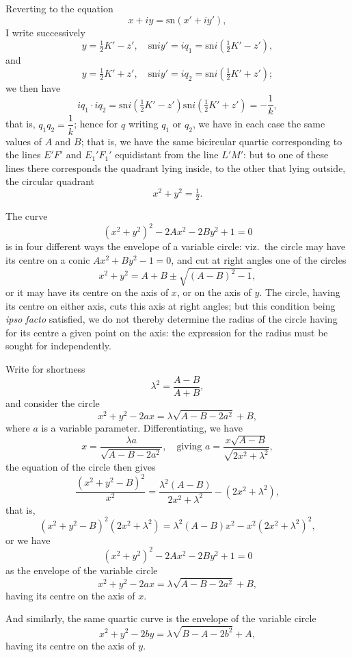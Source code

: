 \documentclass[11pt,a4paper]{book}
\providecommand{\sn}{\mathrm{sn}}
\begin{document}
Reverting to the equation
\[
x + iy = \sn(x' + iy'),
\]
I write successively
\[
y = \tfrac{1}{2}K' - z',\quad \sn iy' = iq_1 = \sn i(\tfrac{1}{2}K' - z'),
\]
and
\[
y = \tfrac{1}{2}K' + z',\quad \sn iy' = iq_2 = \sn i(\tfrac{1}{2}K' + z');
\]
we then have
\[
iq_1 \cdot iq_2 = \sn i(\tfrac{1}{2}K' - z') \sn i(\tfrac{1}{2}K' + z') = -\frac{1}{k},
\]
that is, $q_1q_2 = \dfrac{1}{k}$; hence for $q$ writing $q_1$ or $q_2$, we have in each case the same values of $A$ and $B$; that is, we have the same bicircular quartic corresponding to the lines $E'F'$ and $E_1'F_1'$ equidistant from the line $L'M'$: but to one of these lines there corresponds the quadrant lying inside, to the other that lying outside, the circular quadrant
\[
x^2 + y^2 = \tfrac{1}{2}.
\]

The curve
\[
(x^2+y^2)^2 - 2Ax^2 - 2By^2 + 1 = 0
\]
is in four different ways the envelope of a variable circle: viz.\ the circle may have its centre on a conic $Ax^2 + By^2 - 1 = 0$, and cut at right angles one of the circles
\[
x^2 + y^2 = A + B \pm \sqrt{(A-B)^2 - 1},
\]
or it may have its centre on the axis of $x$, or on the axis of $y$. The circle, having its centre on either axis, cuts this axis at right angles; but this condition being \emph{ipso facto} satisfied, we do not thereby determine the radius of the circle having for its centre a given point on the axis: the expression for the radius must be sought for independently.

Write for shortness
\[
\lambda^2 = \frac{A-B}{A+B},
\]
and consider the circle
\[
x^2 + y^2 - 2ax = \lambda\sqrt{A-B-2a^2} + B,
\]
where $a$ is a variable parameter. Differentiating, we have
\[
x = \frac{\lambda a}{\sqrt{A-B-2a^2}},\quad \text{giving } a = \frac{x\sqrt{A-B}}{\sqrt{2x^2+\lambda^2}},
\]
the equation of the circle then gives
\[
\frac{(x^2+y^2-B)^2}{x^2} = \frac{\lambda^2(A-B)}{2x^2+\lambda^2} - (2x^2+\lambda^2),
\]
that is,
\[
(x^2+y^2-B)^2(2x^2+\lambda^2) = \lambda^2(A-B)x^2 - x^2(2x^2+\lambda^2)^2,
\]
or we have
\[
(x^2+y^2)^2 - 2Ax^2 - 2By^2 + 1 = 0
\]
as the envelope of the variable circle
\[
x^2 + y^2 - 2ax = \lambda\sqrt{A-B-2a^2} + B,
\]
having its centre on the axis of $x$.

And similarly, the same quartic curve is the envelope of the variable circle
\[
x^2 + y^2 - 2by = \lambda\sqrt{B-A-2b^2} + A,
\]
having its centre on the axis of $y$.
\end{document}
